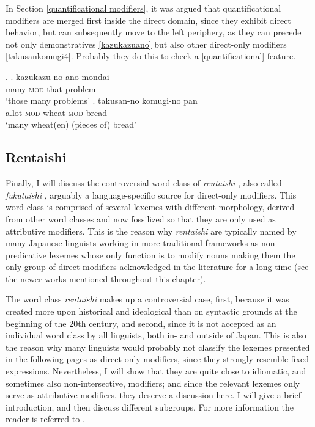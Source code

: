 In Section \ref{quantificational modifiers}, it was argued that quantificational modifiers are merged first inside the direct domain, since they exhibit direct behavior, but can subsequently move to the left periphery, as they can precede not only demonstratives \ref{kazukazuano} but also other direct-only modifiers \ref{takusankomugi4}. Probably they do this to check a [quantificational] feature.

\ex. \ag. kazukazu-no ano mondai\\
many-\textsc{mod} that problem\\
`those many problems’ \label{kazukazuano}
\bg. takusan-no komugi-no pan\\
a.lot-\textsc{mod} wheat-\textsc{mod} bread\\
`many wheat(en) (pieces of) bread’ \label{takusankomugi4}

\subsection{Rentaishi} \label{rentaishi}

Finally, I will discuss the controversial word class of \textit{rentaishi} , also called \textit{fukutaishi} , arguably a language-specific source for direct-only modifiers. This word class is comprised of several lexemes with different morphology, derived from other word classes and now fossilized so that they are only used as attributive modifiers. This is the reason why \textit{rentaishi} are typically named by many Japanese linguists working in more traditional frameworks as non-predicative lexemes whose only function is to modify nouns making them the only group of direct modifiers acknowledged in the literature for a long time (see the newer works mentioned throughout this chapter).

The word class \textit{rentaishi} makes up a controversial case, first, because it was created more upon historical and ideological than on syntactic grounds at the beginning of the 20th century, and second, since it is not accepted as an individual word class by all linguists, both in- and outside of Japan. This is also the reason why many linguists would probably not classify the lexemes presented in the following pages as direct-only modifiers, since they strongly resemble fixed expressions. Nevertheless, I will show that they are quite close to idiomatic, and sometimes also non-intersective, modifiers; and since the relevant lexemes only serve as attributive modifiers, they deserve a discussion here. I will give a brief introduction, and then discuss different subgroups. For more information the reader is referred to \citet{kohlich:2020:rentaishi, kohlich:2023:uninflecting}. 

